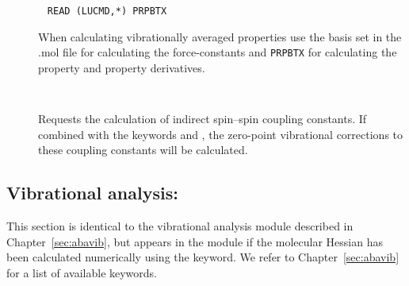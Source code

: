 \begin{description}
\item[]\verb| |\newline
\verb|READ (LUCMD,*) PRPBTX|

When calculating vibrationally averaged properties use the basis set in the 
.mol file for calculating the force-constants and \verb|PRPBTX| for 
calculating the property and property derivatives.

\item[]\verb| |\newline

Requests the calculation of indirect spin--spin coupling constants.
If combined with the keywords  and , the
zero-point vibrational corrections to these coupling constants will be
calculated.

\end{description}

\subsection{Vibrational analysis: }
\label{sec:nmddrv.vibana}

This section is identical to the vibrational analysis module described
in Chapter~\ref{sec:abavib}, but appears in the  module
if the molecular Hessian has been calculated numerically using the 
keyword. We refer to Chapter~\ref{sec:abavib} for a list of available
keywords.
